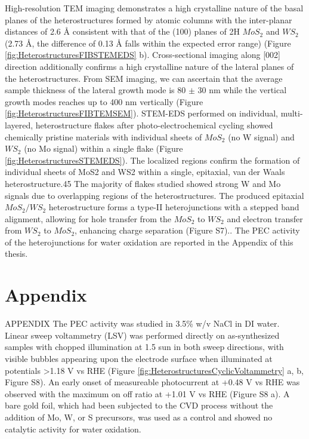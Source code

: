 High-resolution TEM imaging demonstrates a high crystalline nature of the basal planes of the heterostructures formed by atomic columns with the inter-planar distances of 2.6 \r{A} consistent with that of the (100) planes of 2H $MoS_2$ and $WS_2$ (2.73 \r{A}, the difference of 0.13 \r{A} falls within the expected error range) (Figure \ref{fig:HeterostructuresFIBSTEMEDS} b). Cross-sectional imaging along [002] direction additionally confirms a high crystalline nature of the lateral planes of the heterostructures. From SEM imaging, we can ascertain that the average sample thickness of the lateral growth mode is 80 $\pm$ 30 nm while the vertical growth modes reaches up to 400 nm vertically (Figure \ref{fig:HeterostructuresFIBTEMSEM}). STEM-EDS performed on individual, multi-layered, heterostructure flakes after photo-electrochemical cycling showed chemically pristine materials with individual sheets of $MoS_2$ (no W signal) and $WS_2$ (no Mo signal) within a single flake (Figure \ref{fig:HeterostructuresSTEMEDS}). The localized regions confirm the formation of individual sheets of MoS2 and WS2 within a single, epitaxial, van der Waals heterostructure.45 The majority of flakes studied showed strong W and Mo signals due to overlapping regions of the heterostructures. The produced epitaxial $MoS_2/WS_2$ heterostructure forms a type-II heterojunctions with a stepped band alignment, allowing for hole transfer from the $MoS_2$ to $WS_2$ and electron transfer from $WS_2$ to $MoS_2$, enhancing charge separation (Figure S7).\cite{Zhuang2013}\cite{Hong2014}\cite{Ma2018}. 
The PEC activity of the heterojunctions for water oxidation are reported in the Appendix of this thesis. 

\newpage
\section{Appendix}

APPENDIX
The PEC activity was studied in 3.5\% w/v NaCl in DI water. Linear sweep voltammetry (LSV) was performed directly on as-synthesized samples with chopped illumination at 1.5 sun in both sweep directions, with visible bubbles appearing upon the electrode surface when illuminated at potentials >1.18 V vs RHE (Figure \ref{fig:HeterostructuresCyclicVoltammetry} a, b, Figure S8). An early onset of measureable photocurrent at +0.48 V vs RHE was observed with the maximum on off ratio at +1.01 V vs RHE (Figure S8 a). A bare gold foil, which had been subjected to the CVD process without the addition of Mo, W, or S precursors, was used as a control and showed no catalytic activity for water oxidation. 

